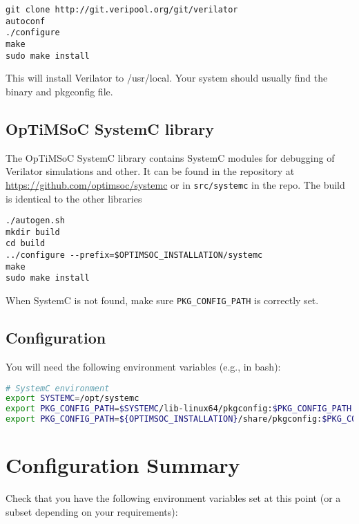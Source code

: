 \begin{lstlisting}
git clone http://git.veripool.org/git/verilator
autoconf
./configure
make
sudo make install
\end{lstlisting}

This will install Verilator to /usr/local. Your system should usually
find the binary and pkgconfig file.

\subsection{OpTiMSoC SystemC library}

The OpTiMSoC SystemC library contains SystemC modules for debugging of
Verilator simulations and other. It can be found in the repository at
\url{https://github.com/optimsoc/systemc} or in \texttt{src/systemc}
in the repo. The build is identical to the other libraries

\begin{lstlisting}
./autogen.sh
mkdir build
cd build
../configure --prefix=$OPTIMSOC_INSTALLATION/systemc
make
sudo make install
\end{lstlisting}

When SystemC is not found, make sure \verb|PKG_CONFIG_PATH| is
correctly set.

\subsection{Configuration}

You will need the following environment variables (e.g., in bash):

\begin{lstlisting}[language=bash]
# SystemC environment
export SYSTEMC=/opt/systemc
export PKG_CONFIG_PATH=$SYSTEMC/lib-linux64/pkgconfig:$PKG_CONFIG_PATH
export PKG_CONFIG_PATH=${OPTIMSOC_INSTALLATION}/share/pkgconfig:$PKG_CONFIG_PATH
\end{lstlisting}

\section{Configuration Summary}

Check that you have the following environment variables set at this
point (or a subset depending on your requirements):

